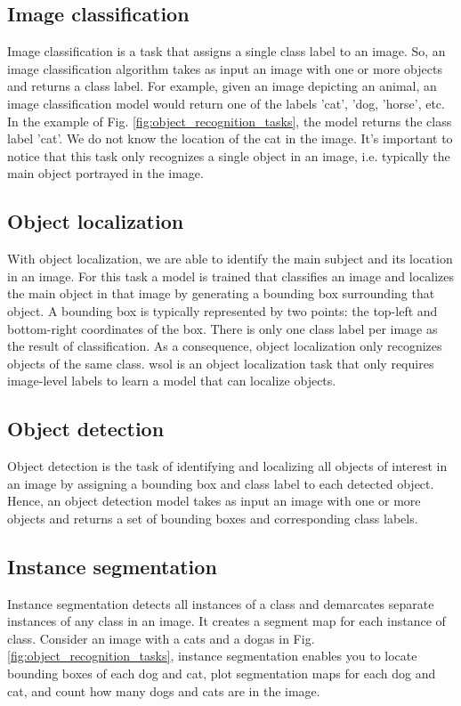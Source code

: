 \subsection{Image classification}
Image classification is a task that assigns a single class label to an image. So, an image classification algorithm takes as input an image with one or more objects and returns a class label. For example, given an image depicting an animal, an image classification model would return one of the labels 'cat', 'dog, 'horse', etc. In the example of Fig. \ref{fig:object_recognition_tasks}, the model returns the class label 'cat'. We do not know the location of the cat in the image. It's important to notice that this task only recognizes a single object in an image, i.e. typically the main object portrayed in the image. 

\subsection{Object localization}
With object localization, we are able to identify the main subject and its location in an image. For this task a model is trained that classifies an image and localizes the main object in that image by generating a bounding box surrounding that object. A bounding box is typically represented by two points: the top-left and bottom-right coordinates of the box. There is only one class label per image as the result of classification. As a consequence, object localization only recognizes objects of the same class. \acrfull{wsol} is an object localization task that only requires image-level labels to learn a model that can localize objects.

\subsection{Object detection}
Object detection is the task of identifying and localizing all objects of interest in an image by assigning a bounding box and class label to each detected object. Hence, an object detection model takes as input an image with one or more objects and returns a set of bounding boxes and corresponding class labels.

\subsection{Instance segmentation}
Instance segmentation detects all instances of a class and demarcates separate instances of any class in an image. It creates a segment map for each instance of class. Consider an image with a cats and a dogas in Fig. \ref{fig:object_recognition_tasks}, instance segmentation enables you to locate bounding boxes of each dog and cat, plot segmentation maps for each dog and cat, and count how many dogs and cats are in the image.

